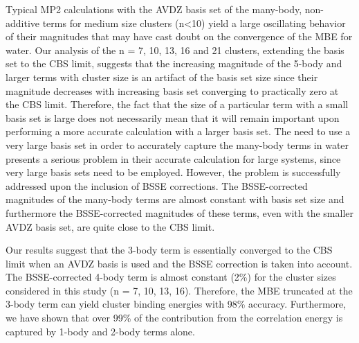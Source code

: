 \documentclass[11pt, proquest]{uwthesis}[2020/02/24]
\newcommand{\textapprox}{\raisebox{0.5ex}{\texttildelow}}
\begin{document}
\par Typical MP2 calculations with the AVDZ basis set of the many-body, non-additive terms for medium size clusters (n\textless 10) yield a large oscillating behavior of their magnitudes that may have cast doubt on the convergence of the MBE for water. Our analysis of the n = 7, 10, 13, 16 and 21 clusters, extending the basis set to the CBS limit, suggests that the increasing magnitude of the 5-body and larger terms with cluster size is an artifact of the basis set size since their magnitude decreases with increasing basis set converging to practically zero at the CBS limit. Therefore, the fact that the size of a particular term with a small basis set is large does not necessarily mean that it will remain important upon performing a more accurate calculation with a larger basis set. The need to use a very large basis set in order to accurately capture the many-body terms in water presents a serious problem in their accurate calculation for large systems, since very large basis sets need to be employed. However, the problem is successfully addressed upon the inclusion of BSSE corrections. The BSSE-corrected magnitudes of the many-body terms are almost constant with basis set size and furthermore the BSSE-corrected magnitudes of these terms, even with the smaller AVDZ basis set, are quite close to the CBS limit. 
\par Our results suggest that the 3-body term is essentially converged to the CBS limit when an AVDZ basis is used and the BSSE correction is taken into account. The BSSE-corrected 4-body term is almost constant (\textapprox2\%) for the cluster sizes considered in this study (n = 7, 10, 13, 16). Therefore, the MBE truncated at the 3-body term can yield cluster binding energies with \textapprox98\% accuracy. Furthermore, we have shown that over 99\% of the contribution from the correlation energy is captured by 1-body and 2-body terms alone.
\end{document}
